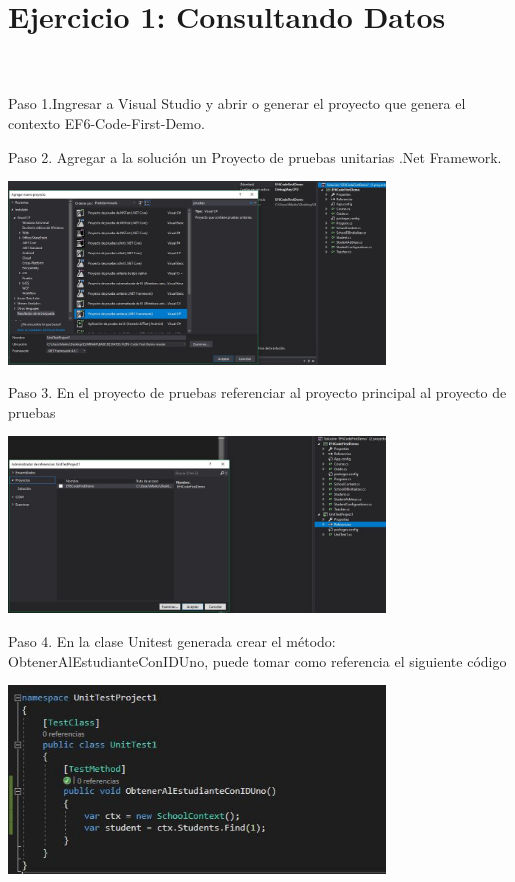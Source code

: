 \section{Ejercicio 1: Consultando Datos} 


\textbf{}\\
\textbf{}\\
Paso 1.Ingresar a Visual Studio y abrir o generar el proyecto que genera el contexto EF6-Code-First-Demo.

Paso 2. Agregar a la solución un Proyecto de pruebas unitarias .Net Framework.

\begin{center}
	\includegraphics[width=10cm]{./Imagenes/Captura1} 
	\end{center}

Paso 3. En el proyecto de pruebas referenciar al proyecto principal al proyecto de pruebas

\begin{center}
	\includegraphics[width=10cm]{./Imagenes/Captura2} 
	\end{center}
Paso 4. En la clase Unitest generada crear el método: ObtenerAlEstudianteConIDUno, puede tomar como
referencia el siguiente código

\begin{center}
	\includegraphics[width=10cm]{./Imagenes/Captura3} 
	\end{center}

